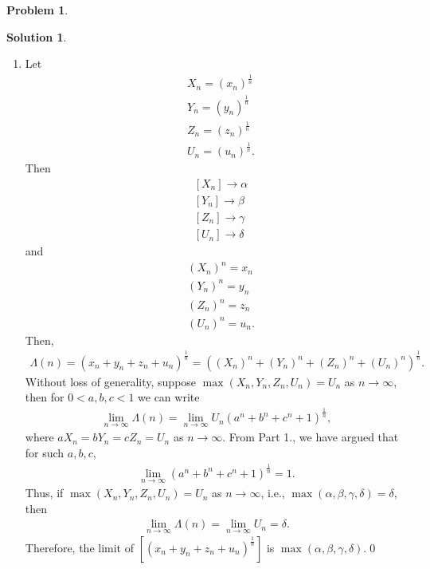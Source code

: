 \documentclass{book}
\theoremstyle{definition}
\newtheorem*{prob*}{Problem}
\newtheorem*{sln*}{Solution}
\begin{document}
\begin{prob*}
\begin{sln*}
\begin{enumerate}
\begin{enumerate}
				\item Let
				\begin{align*}
				&X_n = (x_n)^{\frac{1}{n}}\\
				&Y_n = (y_n)^{\frac{1}{n}}\\
				&Z_n = (z_n)^{\frac{1}{n}}\\
				&U_n = (u_n)^{\frac{1}{n}}.
				\end{align*}
				Then
				\begin{align*}
				& \left[ X_n  \right] \longrightarrow \alpha\\
				& \left[ Y_n  \right] \longrightarrow \beta\\
				& \left[ Z_n \right] \longrightarrow \gamma\\
				& \left[ U_n \right] \longrightarrow \delta
				\end{align*}
				and
				\begin{align*}
				&(X_n)^n = x_n\\
				&(Y_n)^n = y_n\\
				&(Z_n)^n = z_n\\
				&(U_n)^n = u_n.
				\end{align*}
				Then,
				\begin{align*}
				\Lambda(n) =  (x_n + y_n + z_n + u_n)^{\frac{1}{n}} = \left((X_n)^n + (Y_n)^n + (Z_n)^n + (U_n)^n\right)^{\frac{1}{n}}.
				\end{align*}
				Without loss of generality, suppose $\max(X_n ,Y_n, Z_n, U_n) = U_n$ as $n\to\infty$, then for $0 <a,b,c < 1$ we can write
				\begin{align*}
				\lim\limits_{n\to\infty} \Lambda(n)= \lim\limits_{n\to\infty} U_n \left( a^n + b^n + c^n + 1\right)^{\frac{1}{n}},
				\end{align*}
				where $aX_n = bY_n = cZ_n = U_n$ as $n\to\infty$. From Part 1., we have argued that for such $a,b,c$, 
				\begin{align*}
				\lim\limits_{n\to\infty}\left( a^n + b^n + c^n + 1\right)^{\frac{1}{n}} = 1.
				\end{align*} 
				Thus, if $\max(X_n ,Y_n, Z_n, U_n) = U_n$ as $n\to\infty$, i.e., $\max(\alpha,\beta,\gamma,\delta) = \delta$, then 
				\begin{align*}
				\lim\limits_{n\to\infty}\Lambda(n) = \lim\limits_{n\to\infty}U_n = \delta. 
				\end{align*}
				Therefore, the limit of $\left[ (x_n + y_n + z_n + u_n)^{\frac{1}{n}} \right]$ is $\max(\alpha,\beta,\gamma,\delta)$.\qed
			\end{enumerate}
		

\end{enumerate}
\end{sln*}
\end{prob*}
\end{document}
